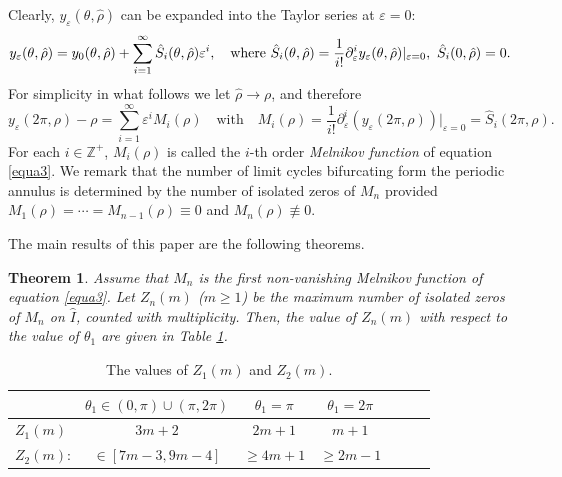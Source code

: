 \documentclass[11pt]{amsart}
\newtheorem{thm}{Theorem}[section]
\theoremstyle{remark}
\theoremstyle{definition}
\begin{document}
Clearly, $ y_{\varepsilon}(\theta,\hat{\rho}) $ can be expanded into the Taylor series at $ \varepsilon=0 $:
\begin{equation*}\label{equa1-4-1}
y_{\varepsilon}(\theta,\hat{\rho})=y_{0}(\theta,\hat{\rho})+\sum_{i=1}^{\infty}\hat{S}_{i}(\theta,\hat{\rho})\varepsilon^{i}, \quad \text{where $ \hat{S}_{i}(\theta,\hat{\rho})=\frac{1}{i!}\partial_{\varepsilon}^{i}y_{\varepsilon}(\theta,\hat{\rho})|_{\varepsilon=0} $},\
\hat{S}_{i}(0,\hat{\rho})=0.
\end{equation*}
For simplicity in what follows we let $\hat{\rho}\to\rho$, and therefore
\begin{equation}\label{equa1-5}
y_{\varepsilon}(2\pi,\rho)-\rho=\sum_{i=1}^{\infty}\varepsilon^{i}M_{i}(\rho)   \quad \text{with} \quad M_{i}(\rho)=\frac{1}{i!}\partial_{\varepsilon}^{i}\left(y_{\varepsilon}(2\pi,\rho)\right)|_{\varepsilon=0}=\hat{S}_{i}(2\pi,\rho).
\end{equation}
For each $i\in\mathbb Z^+$, $ M_{i}(\rho) $ is called the $i$-th order \emph{Melnikov function} of equation \eqref{equa3}.
We remark that the number of limit cycles bifurcating form the periodic annulus is determined by the number of isolated zeros of    $M_n$  provided $M_1(\rho)=\cdots=M_{n-1}(\rho)\equiv 0$ and $M_n(\rho)\not\equiv 0$.

The main results of this paper are the following theorems.


\begin{thm} \label{thm1-1} Assume that $M_n$ is the first non-vanishing Melnikov function of equation \eqref{equa3}. Let $Z_n(m)$  ($m\geq1$) be the maximum number of isolated zeros of $M_n$  on $\hat{I}$,
counted with multiplicity. Then, the value of $Z_n(m)$  with respect to the value of $\theta_1$   are
given in Table \ref{table1}.

\end{thm}
\begin{table}[hpt]\label{table1}
 \centering
 \renewcommand\arraystretch{1.5}
\begin{tabular}{|l|*{6}{c|}}\hline
 \quad &$\theta_{1}\in(0,\pi)\cup(\pi,2\pi)$ &$\theta_{1}=\pi$  &$\theta_{1}=2\pi$  \\ \hline
 $Z_1(m)$   & $3m+2$        & $2m+1$   & $m+1$  \\  \hline
 $Z_2(m)$: & $\in [7m-3, 9m-4]$        & $\geq 4m+1$   &$\geq 2m-1$  \\ \hline
\end{tabular}
\vskip0.1cm
\caption{The values of $Z_1(m)$ and $Z_2(m)$. }\vspace{-0.7cm}
\end{table}
\end{document}
